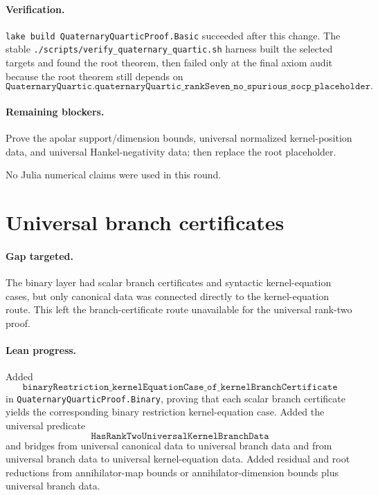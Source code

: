 \documentclass[11pt]{article}
\begin{document}
\paragraph{Verification.}
\texttt{lake build QuaternaryQuarticProof.Basic} succeeded after this change.
The stable \texttt{./scripts/verify\_quaternary\_quartic.sh} harness built the
selected targets and found the root theorem, then failed only at the final axiom
audit because the root theorem still depends on
\[
\texttt{QuaternaryQuartic.quaternaryQuartic\_rankSeven\_no\_spurious\_socp\_placeholder}.
\]

\paragraph{Remaining blockers.}
Prove the apolar support/dimension bounds, universal normalized kernel-position
data, and universal Hankel-negativity data; then replace the root placeholder.

No Julia numerical claims were used in this round.

\section*{Universal branch certificates}

\paragraph{Gap targeted.}
The binary layer had scalar branch certificates and syntactic kernel-equation
cases, but only canonical data was connected directly to the kernel-equation
route.  This left the branch-certificate route unavailable for the universal
rank-two proof.

\paragraph{Lean progress.}
Added
\[
\texttt{binaryRestriction\_kernelEquationCase\_of\_kernelBranchCertificate}
\]
in \texttt{QuaternaryQuarticProof.Binary}, proving that each scalar branch
certificate yields the corresponding binary restriction kernel-equation case.
Added the universal predicate
\[
\texttt{HasRankTwoUniversalKernelBranchData}
\]
and bridges from universal canonical data to universal branch data and from
universal branch data to universal kernel-equation data.  Added residual and
root reductions from annihilator-map bounds or annihilator-dimension bounds
plus universal branch data.
\end{document}
